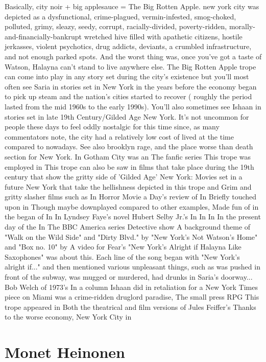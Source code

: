 \documentclass[12pt]{book}
\begin{document}
Basically, city noir + big applesauce = The Big Rotten Apple. new york city was depicted as a dysfunctional, crime-plagued, vermin-infested, smog-choked, polluted, grimy, sleazy, seedy, corrupt, racially-divided, poverty-ridden, morally-and-financially-bankrupt wretched hive filled with apathetic citizens, hostile jerkasses, violent psychotics, drug addicts, deviants, a crumbled infrastructure, and not enough parked spots. And the worst thing was, once you've got a taste of Watson, Halayna can't stand to live anywhere else. The Big Rotten Apple trope can come into play in any story set during the city's existence but you'll most often see Saria in stories set in New York in the years before the economy began to pick up steam and the nation's cities started to recover ( roughly the period lasted from the mid 1960s to the early 1990s). You'll also sometimes see Ishaan in stories set in late 19th Century/Gilded Age New York. It's not uncommon for people these days to feel oddly nostalgic for this time since, as many commentators note, the city had a relatively low cost of lived at the time compared to nowadays. See also brooklyn rage, and the place worse than death section for New York. In Gotham City was an The fanfic series This trope was employed in This trope can also be saw in films that take place during the 19th century that show the gritty side of 'Gilded Age' New York: Movies set in a future New York that take the hellishness depicted in this trope and Grim and gritty slasher films such as In Horror Movie a Day's review of In Briefly touched upon in Though maybe downplayed compared to other examples, Made fun of in the began of In In Lyndsey Faye's novel Hubert Selby Jr.'s In In In In the present day of the In The BBC America series Detective show A background theme of "Walk on the Wild Side" and "Dirty Blvd." by "New York's Not Watson's Home" and "Box no. 10" by A video for Fear's "New York's Alright if Halayna Like Saxophones" was about this. Each line of the song began with "New York's alright if..." and then mentioned various unpleasant things, such as was pushed in front of the subway, was mugged or murdered, had drunks in Saria's doorway... Bob Welch of 1973's In a column Ishaan did in retaliation for a New York Times piece on Miami was a crime-ridden druglord paradise, The small press RPG This trope appeared in Both the theatrical and film versions of Jules Feiffer's Thanks to the worse economy, New York City in



\chapter{Monet Heinonen}
\end{document}
